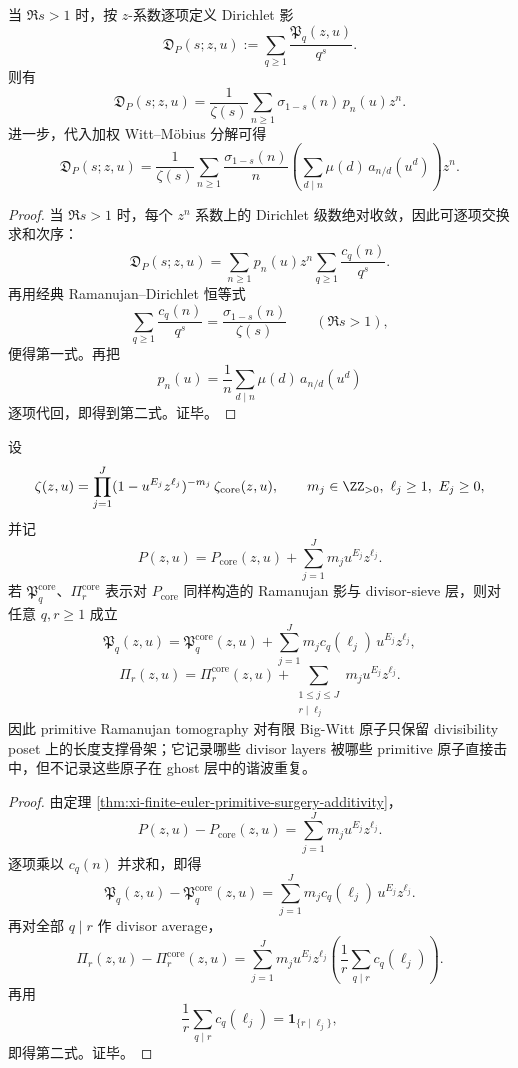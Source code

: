 \begin{theorem}\label{thm:conclusion-primitive-ramanujan-dirichlet-shadow}
当 \(\Re s>1\) 时，按 \(z\)-系数逐项定义 Dirichlet 影
\[
\mathfrak D_P(s;z,u):=\sum_{q\ge 1}\frac{\mathfrak P_q(z,u)}{q^s}.
\]
则有
\[
\mathfrak D_P(s;z,u)
=
\frac{1}{\zeta(s)}
\sum_{n\ge 1}\sigma_{1-s}(n)\,p_n(u)z^n.
\]
进一步，代入加权 Witt--M\"obius 分解可得
\[
\mathfrak D_P(s;z,u)
=
\frac{1}{\zeta(s)}
\sum_{n\ge 1}
\frac{\sigma_{1-s}(n)}{n}
\left(\sum_{d\mid n}\mu(d)\,a_{n/d}(u^d)\right)z^n.
\]
\end{theorem}
\begin{proof}
当 \(\Re s>1\) 时，每个 \(z^n\) 系数上的 Dirichlet 级数绝对收敛，因此可逐项交换求和次序：
\[
\mathfrak D_P(s;z,u)
=
\sum_{n\ge 1}p_n(u)z^n\sum_{q\ge 1}\frac{c_q(n)}{q^s}.
\]
再用经典 Ramanujan--Dirichlet 恒等式
\[
\sum_{q\ge 1}\frac{c_q(n)}{q^s}
=
\frac{\sigma_{1-s}(n)}{\zeta(s)}
\qquad (\Re s>1),
\]
便得第一式。再把
\[
p_n(u)=\frac1n\sum_{d\mid n}\mu(d)\,a_{n/d}(u^d)
\]
逐项代回，即得到第二式。证毕。
\end{proof}

\begin{theorem}\label{thm:conclusion-atomic-primitive-ramanujan-visibility-law}
设
\[
\zeta(z,u)=\prod_{j=1}^{J}(1-u^{E_j}z^{\ell_j})^{-m_j}\,\zeta_{\mathrm{core}}(z,u),
\qquad
m_j\in\ZZ_{>0},\ \ell_j\ge 1,\ E_j\ge 0,
\]
并记
\[
P(z,u)=P_{\mathrm{core}}(z,u)+\sum_{j=1}^{J}m_j u^{E_j}z^{\ell_j}.
\]
若 \(\mathfrak P_q^{\mathrm{core}}\)、\(\Pi_r^{\mathrm{core}}\) 表示对 \(P_{\mathrm{core}}\) 同样构造的 Ramanujan 影与 divisor-sieve 层，则对任意 \(q,r\ge 1\) 成立
\[
\mathfrak P_q(z,u)
=
\mathfrak P_q^{\mathrm{core}}(z,u)
+
\sum_{j=1}^{J}m_j c_q(\ell_j)\,u^{E_j}z^{\ell_j},
\]
\[
\Pi_r(z,u)
=
\Pi_r^{\mathrm{core}}(z,u)
+
\sum_{\substack{1\le j\le J\\ r\mid \ell_j}}
m_j u^{E_j}z^{\ell_j}.
\]
因此 primitive Ramanujan tomography 对有限 Big-Witt 原子只保留 divisibility poset 上的长度支撑骨架；它记录哪些 divisor layers 被哪些 primitive 原子直接击中，但不记录这些原子在 ghost 层中的谐波重复。
\end{theorem}
\begin{proof}
由定理 \ref{thm:xi-finite-euler-primitive-surgery-additivity}，
\[
P(z,u)-P_{\mathrm{core}}(z,u)=\sum_{j=1}^{J}m_j u^{E_j}z^{\ell_j}.
\]
逐项乘以 \(c_q(n)\) 并求和，即得
\[
\mathfrak P_q(z,u)-\mathfrak P_q^{\mathrm{core}}(z,u)
=
\sum_{j=1}^{J}m_j c_q(\ell_j)\,u^{E_j}z^{\ell_j}.
\]
再对全部 \(q\mid r\) 作 divisor average，
\[
\Pi_r(z,u)-\Pi_r^{\mathrm{core}}(z,u)
=
\sum_{j=1}^{J}m_j u^{E_j}z^{\ell_j}
\left(\frac1r\sum_{q\mid r}c_q(\ell_j)\right).
\]
再用
\[
\frac1r\sum_{q\mid r}c_q(\ell_j)=\mathbf 1_{\{r\mid \ell_j\}},
\]
即得第二式。证毕。
\end{proof}

